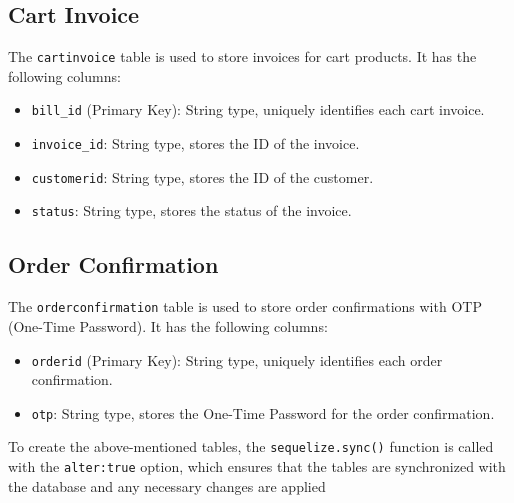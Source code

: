 \subsection{Cart Invoice}

The \texttt{cartinvoice} table is used to store invoices for cart products. It has the following columns:

\begin{itemize}
    \item \texttt{bill\_id} (Primary Key): String type, uniquely identifies each cart invoice.
    \item \texttt{invoice\_id}: String type, stores the ID of the invoice.
    \item \texttt{customerid}: String type, stores the ID of the customer.
    \item \texttt{status}: String type, stores the status of the invoice.
\end{itemize}

\subsection{Order Confirmation}

The \texttt{orderconfirmation} table is used to store order confirmations with OTP (One-Time Password). It has the following columns:

\begin{itemize}
    \item \texttt{orderid} (Primary Key): String type, uniquely identifies each order confirmation.
    \item \texttt{otp}: String type, stores the One-Time Password for the order confirmation.
\end{itemize}

To create the above-mentioned tables, the \texttt{sequelize.sync()} function is called with the \texttt{alter:true} option, which ensures that the tables are synchronized with the database and any necessary changes are applied

